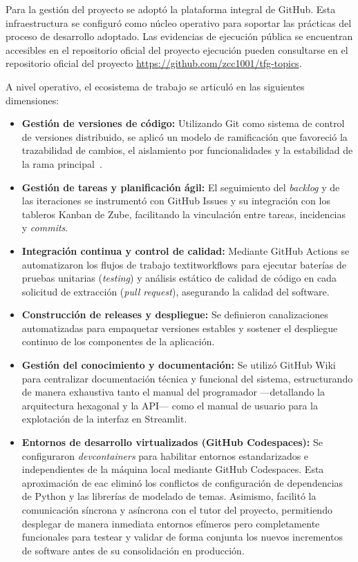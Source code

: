 Para la gestión del proyecto \nombreProyecto{} se adoptó la plataforma integral
de GitHub. Esta infraestructura se configuró como núcleo operativo para
soportar las prácticas del proceso de desarrollo adoptado. Las evidencias de
ejecución pública se encuentran accesibles en el repositorio oficial del
proyecto ejecución pueden consultarse en el repositorio oficial del proyecto
\url{https://github.com/zcc1001/tfg-topics}.

A nivel operativo, el ecosistema de trabajo se articuló en las siguientes
dimensiones:

\begin{itemize}
    \item \textbf{Gestión de versiones de código:} Utilizando Git como sistema de control de versiones distribuido, se aplicó un modelo de ramificación que favoreció la trazabilidad de cambios, el aislamiento por funcionalidades y la estabilidad de la rama principal~\cite{GitReference}.
    \item \textbf{Gestión de tareas y planificación ágil:} El seguimiento del \textit{backlog} y de las iteraciones se instrumentó con GitHub Issues y su integración con los tableros Kanban de Zube, facilitando la vinculación entre tareas, incidencias y \textit{commits}.
    \item \textbf{Integración continua y control de calidad:} Mediante GitHub Actions  se automatizaron los flujos de trabajo textit{workflows} para ejecutar baterías de pruebas unitarias (\textit{testing}) y análisis estático de calidad de código en cada solicitud de extracción (\textit{pull request}), asegurando la calidad del software.
    \item \textbf{Construcción de releases y despliegue:} Se definieron canalizaciones automatizadas para empaquetar versiones estables y sostener el despliegue continuo de los componentes de la aplicación.
    \item \textbf{Gestión del conocimiento y documentación:} Se utilizó GitHub Wiki para centralizar documentación técnica y funcional del sistema, estructurando de manera exhaustiva tanto el manual del programador —detallando la arquitectura hexagonal y la API— como el manual de usuario para la explotación de la interfaz en Streamlit.
    \item \textbf{Entornos de desarrollo virtualizados (GitHub Codespaces):} Se configuraron \textit{devcontainers} para habilitar entornos estandarizados  e independientes de la máquina local mediante GitHub Codespaces. Esta aproximación de \acrfull{eac} eliminó los conflictos de configuración de dependencias de Python y las librerías de modelado de temas. Asimismo, facilitó la comunicación síncrona y asíncrona con el tutor del proyecto, permitiendo desplegar de manera inmediata entornos efímeros pero completamente funcionales para testear y validar de forma conjunta los nuevos incrementos de software antes de su consolidación en producción.

\end{itemize}

